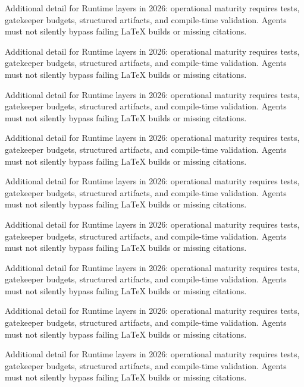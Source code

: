 Additional detail for Runtime layers in 2026: operational maturity requires tests, gatekeeper budgets, structured artifacts, and compile-time validation. Agents must not silently bypass failing LaTeX builds or missing citations. \cite{crewai2024} \cite{langgraph2024} \cite{mcp2024}

Additional detail for Runtime layers in 2026: operational maturity requires tests, gatekeeper budgets, structured artifacts, and compile-time validation. Agents must not silently bypass failing LaTeX builds or missing citations. \cite{crewai2024} \cite{langgraph2024} \cite{mcp2024}

Additional detail for Runtime layers in 2026: operational maturity requires tests, gatekeeper budgets, structured artifacts, and compile-time validation. Agents must not silently bypass failing LaTeX builds or missing citations. \cite{crewai2024} \cite{langgraph2024} \cite{mcp2024}

Additional detail for Runtime layers in 2026: operational maturity requires tests, gatekeeper budgets, structured artifacts, and compile-time validation. Agents must not silently bypass failing LaTeX builds or missing citations. \cite{crewai2024} \cite{langgraph2024} \cite{mcp2024}

Additional detail for Runtime layers in 2026: operational maturity requires tests, gatekeeper budgets, structured artifacts, and compile-time validation. Agents must not silently bypass failing LaTeX builds or missing citations. \cite{crewai2024} \cite{langgraph2024} \cite{mcp2024}

Additional detail for Runtime layers in 2026: operational maturity requires tests, gatekeeper budgets, structured artifacts, and compile-time validation. Agents must not silently bypass failing LaTeX builds or missing citations. \cite{crewai2024} \cite{langgraph2024} \cite{mcp2024}

Additional detail for Runtime layers in 2026: operational maturity requires tests, gatekeeper budgets, structured artifacts, and compile-time validation. Agents must not silently bypass failing LaTeX builds or missing citations. \cite{crewai2024} \cite{langgraph2024} \cite{mcp2024}

Additional detail for Runtime layers in 2026: operational maturity requires tests, gatekeeper budgets, structured artifacts, and compile-time validation. Agents must not silently bypass failing LaTeX builds or missing citations. \cite{crewai2024} \cite{langgraph2024} \cite{mcp2024}

Additional detail for Runtime layers in 2026: operational maturity requires tests, gatekeeper budgets, structured artifacts, and compile-time validation. Agents must not silently bypass failing LaTeX builds or missing citations. \cite{crewai2024} \cite{langgraph2024} \cite{mcp2024}

